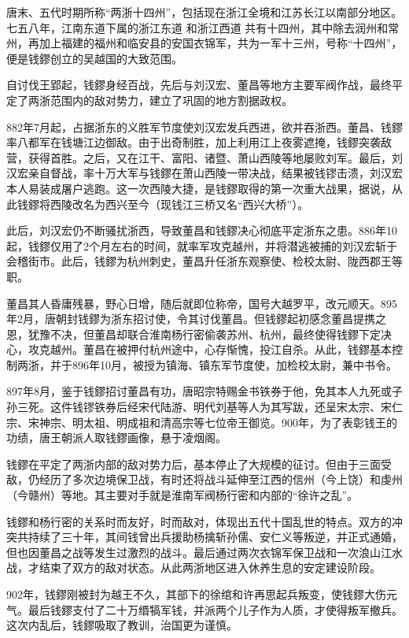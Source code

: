 唐末、五代时期所称“两浙十四州”，包括现在浙江全境和江苏长江以南部分地区。七五八年，江南东道下属的浙江东道 和浙江西道 共有十四州，其中除去润州和常州，再加上福建的福州和临安县的安国衣锦军，共为一军十三州，号称“十四州”，便是钱鏐创立的吴越国的大致范围。

自讨伐王郢起，钱鏐身经百战，先后与刘汉宏、董昌等地方主要军阀作战，最终平定了两浙范围内的敌对势力，建立了巩固的地方割据政权。

882年7月起，占据浙东的义胜军节度使刘汉宏发兵西进，欲并吞浙西。董昌、钱鏐率八都军在钱塘江边御敌。由于出奇制胜，加上利用江上夜雾遮掩，钱鏐突袭敌营，获得首胜。之后，又在江干、富阳、诸暨、萧山西陵等地屡败刘军。最后，刘汉宏亲自督战，率十万大军与钱鏐在萧山西陵一带决战，结果被钱镠击溃，刘汉宏本人易装成屠户逃跑。这一次西陵大捷，是钱鏐取得的第一次重大战果，据说，从此钱鏐将西陵改名为西兴至今（现钱江三桥又名“西兴大桥”）。

此后，刘汉宏仍不断骚扰浙西，导致董昌和钱鏐决心彻底平定浙东之患。886年10起，钱鏐仅用了2个月左右的时间，就率军攻克越州，并将潜逃被捕的刘汉宏斩于会稽街市。此后，钱鏐为杭州刺史，董昌升任浙东观察使、检校太尉、陇西郡王等职。

董昌其人昏庸残暴，野心日增，随后就即位称帝，国号大越罗平，改元顺天。895年2月，唐朝封钱鏐为浙东招讨使，令其讨伐董昌。但钱鏐起初感念董昌提携之恩，犹豫不决，但董昌却联合淮南杨行密偷袭苏州、杭州，最终使得钱鏐下定决心，攻克越州。董昌在被押付杭州途中，心存惭愧，投江自杀。从此，钱鏐基本控制两浙，并于896年10月，被授为镇海、镇东军节度使，加检校太尉，兼中书令。

897年8月，鉴于钱鏐招讨董昌有功，唐昭宗特赐金书铁券于他，免其本人九死或子孙三死。这件钱镠铁券后经宋代陆游、明代刘基等人为其写跋，还呈宋太宗、宋仁宗、宋神宗、明太祖、明成祖和清高宗等七位帝王御览。900年，为了表彰钱王的功绩，唐王朝派人取钱鏐画像，悬于凌烟阁。

钱鏐在平定了两浙内部的敌对势力后，基本停止了大规模的征讨。但由于三面受敌，仍经历了多次边境保卫战，有时还将战斗延伸至江西的信州（今上饶）和虔州（今赣州）等地。其主要对手就是淮南军阀杨行密和内部的“徐许之乱”。

钱鏐和杨行密的关系时而友好，时而敌对，体现出五代十国乱世的特点。双方的冲突共持续了三十年，其间钱曾出兵援助杨擒斩孙儒、安仁义等叛逆，并正式通婚，但也因董昌之战等发生过激烈的战斗。最后通过两次衣锦军保卫战和一次浪山江水战，才结束了双方的敌对状态。从此两浙地区进入休养生息的安定建设阶段。

902年，钱鏐刚被封为越王不久，其部下的徐绾和许再思起兵叛变，使钱鏐大伤元气。最后钱鏐支付了二十万缗犒军钱，并派两个儿子作为人质，才使得叛军撤兵。这次内乱后，钱鏐吸取了教训，治国更为谨慎。

